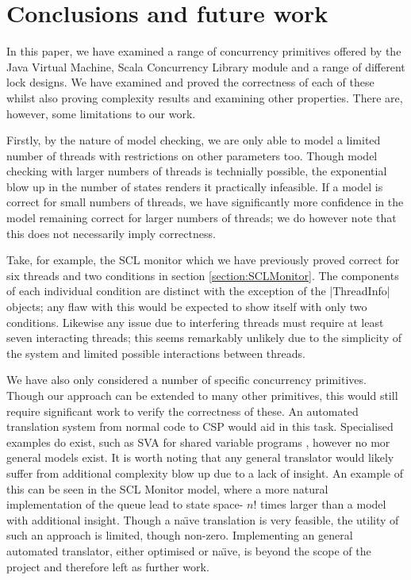 \section{Conclusions and future work}

In this paper, we have examined a range of concurrency primitives offered by the Java Virtual Machine, Scala Concurrency Library module and a range of different lock designs. We have examined and proved the correctness of each of these whilst also proving complexity results and examining other properties. There are, however, some limitations to our work. 

Firstly, by the nature of model checking, we are only able to model a limited number of threads with restrictions on other parameters too. Though model checking with larger numbers of threads is technially possible, the exponential blow up in the number of states renders it practically infeasible. If a model is correct for small numbers of threads, we have significantly more confidence in the model remaining correct for larger numbers of threads; we do however note that this does not necessarily imply correctness. 

Take, for example, the SCL monitor which we have previously proved correct for six threads and two conditions in section \ref{section:SCLMonitor}. The components of each individual condition are distinct with the exception of the |ThreadInfo| objects; any flaw with this would be expected to show itself with only two conditions. Likewise any issue due to interfering threads must require at least seven interacting threads; this seems remarkably unlikely due to the simplicity of the system and limited possible interactions between threads. 

We have also only considered a number of specific concurrency primitives. Though our approach can be extended to many other primitives, this would still require significant work to verify the correctness of these. An automated translation system from normal code to CSP would aid in this task. Specialised examples do exist, such as SVA for shared variable programs \cite{RoscoeSVA}, however no mor general models exist. It is worth noting that any general translator would likely suffer from additional complexity blow up due to a lack of insight. An example of this can be seen in the SCL Monitor model, where a more natural implementation of the queue lead to state space- $n!$ times larger than a model with additional insight. Though a na\"{\i}ve translation is very feasible, the utility of such an approach is limited, though non-zero. Implementing an general automated translator, either optimised or na\"{\i}ve, is beyond the scope of the project and therefore left as further work. 